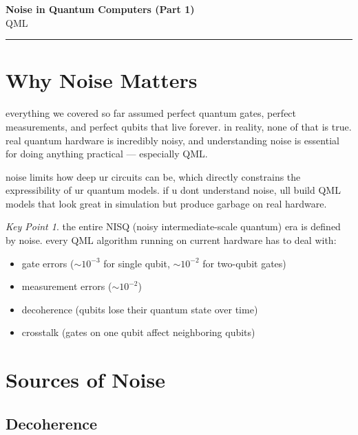 \documentclass[11pt,a4paper]{article}
\theoremstyle{definition}
\theoremstyle{remark}
\newtheorem*{keypoint}{Key Point}
\begin{document}
\begin{center}
    {\LARGE \textbf{Noise in Quantum Computers (Part 1)}}\\[8pt]
    {\large QML}\\[12pt]
    \hrule
\end{center}

\vspace{12pt}
\tableofcontents
\newpage

\section{Why Noise Matters}

everything we covered so far assumed perfect quantum gates, perfect measurements, and perfect qubits that live forever. in reality, none of that is true. real quantum hardware is incredibly noisy, and understanding noise is essential for doing anything practical --- especially QML.

noise limits how deep ur circuits can be, which directly constrains the expressibility of ur quantum models. if u dont understand noise, ull build QML models that look great in simulation but produce garbage on real hardware.

\begin{keypoint}
the entire NISQ (noisy intermediate-scale quantum) era is defined by noise. every QML algorithm running on current hardware has to deal with:
\begin{itemize}
    \item gate errors ($\sim 10^{-3}$ for single qubit, $\sim 10^{-2}$ for two-qubit gates)
    \item measurement errors ($\sim 10^{-2}$)
    \item decoherence (qubits lose their quantum state over time)
    \item crosstalk (gates on one qubit affect neighboring qubits)
\end{itemize}
\end{keypoint}

\section{Sources of Noise}

\subsection{Decoherence}
\end{document}
